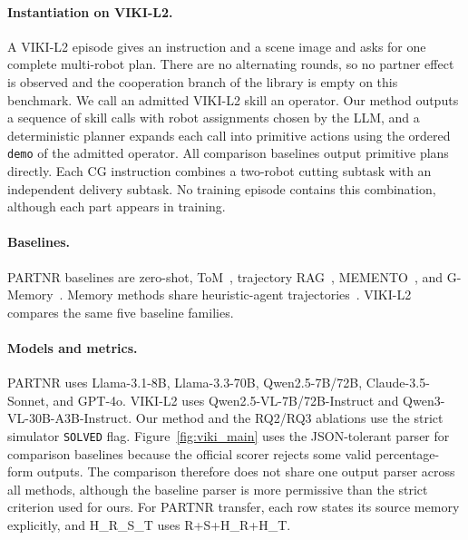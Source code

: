\documentclass{article}
\theoremstyle{plain}
\theoremstyle{definition}
\theoremstyle{remark}
\begin{document}
\paragraph{Instantiation on VIKI-L2.}
A VIKI-L2 episode gives an instruction and a scene image and asks for one complete multi-robot plan. There are no alternating rounds, so no partner effect is observed and the cooperation branch of the library is empty on this benchmark. We call an admitted VIKI-L2 skill an operator. Our method outputs a sequence of skill calls with robot assignments chosen by the LLM, and a deterministic planner expands each call into primitive actions using the ordered \texttt{demo} of the admitted operator. All comparison baselines output primitive plans directly. Each CG instruction combines a two-robot cutting subtask with an independent delivery subtask. No training episode contains this combination, although each part appears in training.
 
 
\paragraph{Baselines.}
PARTNR baselines are zero-shot, ToM~\citep{li2023theory}, trajectory RAG~\citep{lewis2020retrieval}, MEMENTO~\citep{kwon2026memento}, and G-Memory~\citep{zhang2025g}. Memory methods share heuristic-agent trajectories~\citep{PARTNR}. VIKI-L2 compares the same five baseline families.
 
\paragraph{Models and metrics.}
PARTNR uses Llama-3.1-8B, Llama-3.3-70B, Qwen2.5-7B/72B, Claude-3.5-Sonnet, and GPT-4o. VIKI-L2 uses Qwen2.5-VL-7B/72B-Instruct and Qwen3-VL-30B-A3B-Instruct. Our method and the RQ2/RQ3 ablations use the strict simulator \texttt{SOLVED} flag. Figure~\ref{fig:viki_main} uses the JSON-tolerant parser for comparison baselines because the official scorer rejects some valid percentage-form outputs. The comparison therefore does not share one output parser across all methods, although the baseline parser is more permissive than the strict criterion used for ours. For PARTNR transfer, each row states its source memory explicitly, and H\_R\_S\_T uses R+S+H\_R+H\_T.
 
\end{document}
